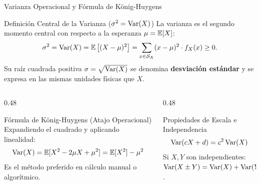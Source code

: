 \documentclass[10pt, aspectratio=169]{beamer}
\begin{document}
\begin{frame}{Varianza Operacional y Fórmula de König-Huygens}
  \begin{block}{Definición Central de la Varianza ($\sigma^2 = \operatorname{Var}(X)$)}
    \footnotesize
    La varianza es el segundo momento central con respecto a la esperanza $\mu = \mathbb{E}[X]$:
    $$\sigma^2 = \operatorname{Var}(X) = \mathbb{E}\left[ (X - \mu)^2 \right] = \sum_{x \in \mathcal{S}_X} (x - \mu)^2 \cdot f_X(x) \ge 0.$$
    Su raíz cuadrada positiva $\sigma = \sqrt{\operatorname{Var}(X)}$ se denomina \textbf{desviación estándar} y se expresa en las mismas unidades físicas que $X$.
  \end{block}
  \vspace{-0.05cm}
  \pause
  \begin{columns}[T]
    \begin{column}{0.48\textwidth}
      \begin{alertblock}{Fórmula de König-Huygens (Atajo Operacional)}
        \footnotesize
        Expandiendo el cuadrado y aplicando linealidad:
        $$\operatorname{Var}(X) = \mathbb{E}[X^2 - 2\mu X + \mu^2] = \mathbb{E}[X^2] - \mu^2$$
        Es el método preferido en cálculo manual o algorítmico.
      \end{alertblock}
    \end{column}
    \begin{column}{0.48\textwidth}
      \begin{block}{Propiedades de Escala e Independencia}
        \footnotesize
        $$\operatorname{Var}(cX + d) = c^2 \operatorname{Var}(X)$$
        Si $X, Y$ son independientes: $\operatorname{Var}(X \pm Y) = \operatorname{Var}(X) + \operatorname{Var}(Y)$.
      \end{block}
    \end{column}
  \end{columns}
\end{frame}
\end{document}

